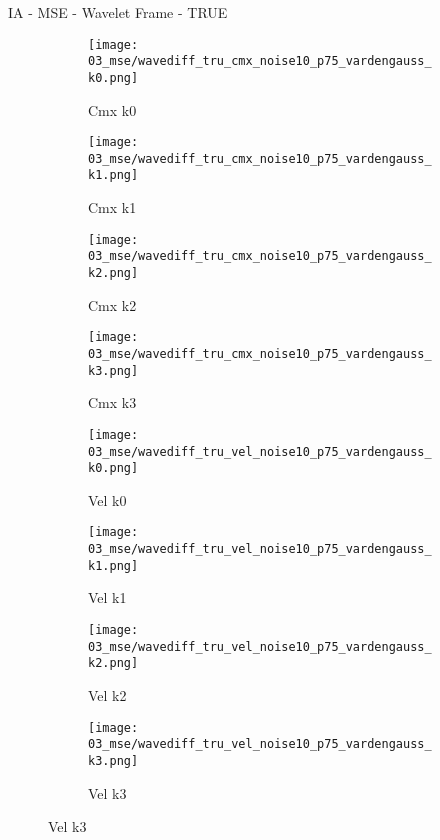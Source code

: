 \documentclass{beamer}
\begin{document}
\begin{frame}{IA - MSE - Wavelet Frame - TRUE}{}
\begin{figure}
\begin{subfigure}{0.24\textwidth}
\texttt{[image: 03\_mse/wavediff\_tru\_cmx\_noise10\_p75\_vardengauss\_k0.png]}
\vspace{-20pt}
\caption*{\tiny Cmx k0}
\end{subfigure}
\begin{subfigure}{0.24\textwidth}
\texttt{[image: 03\_mse/wavediff\_tru\_cmx\_noise10\_p75\_vardengauss\_k1.png]}
\vspace{-20pt}
\caption*{\tiny Cmx k1}
\end{subfigure}
\begin{subfigure}{0.24\textwidth}
\texttt{[image: 03\_mse/wavediff\_tru\_cmx\_noise10\_p75\_vardengauss\_k2.png]}
\vspace{-20pt}
\caption*{\tiny Cmx k2}
\end{subfigure}
\begin{subfigure}{0.24\textwidth}
\texttt{[image: 03\_mse/wavediff\_tru\_cmx\_noise10\_p75\_vardengauss\_k3.png]}
\vspace{-20pt}
\caption*{\tiny Cmx k3}
\end{subfigure}

\begin{subfigure}{0.24\textwidth}
\texttt{[image: 03\_mse/wavediff\_tru\_vel\_noise10\_p75\_vardengauss\_k0.png]}
\vspace{-20pt}
\caption*{\tiny Vel k0}
\end{subfigure}
\begin{subfigure}{0.24\textwidth}
\texttt{[image: 03\_mse/wavediff\_tru\_vel\_noise10\_p75\_vardengauss\_k1.png]}
\vspace{-20pt}
\caption*{\tiny Vel k1}
\end{subfigure}
\begin{subfigure}{0.24\textwidth}
\texttt{[image: 03\_mse/wavediff\_tru\_vel\_noise10\_p75\_vardengauss\_k2.png]}
\vspace{-20pt}
\caption*{\tiny Vel k2}
\end{subfigure}
\begin{subfigure}{0.24\textwidth}
\texttt{[image: 03\_mse/wavediff\_tru\_vel\_noise10\_p75\_vardengauss\_k3.png]}
\vspace{-20pt}
\caption*{\tiny Vel k3}
\end{subfigure}
\end{figure}
\end{frame}
\end{document}
